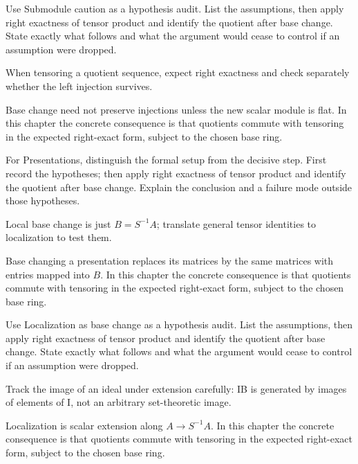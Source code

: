 \begin{exercise}\label{exr:v11-04}
Use Submodule caution as a hypothesis audit. List the assumptions, then apply right exactness of tensor product and identify the quotient after base change. State exactly what follows and what the argument would cease to control if an assumption were dropped.
\end{exercise}
\begin{hint}
When tensoring a quotient sequence, expect right exactness and check separately whether the left injection survives.
\end{hint}
\begin{solution}
Base change need not preserve injections unless the new scalar module is flat. In this chapter the concrete consequence is that quotients commute with tensoring in the expected right-exact form, subject to the chosen base ring.
\end{solution}

\begin{exercise}\label{exr:v11-05}
For Presentations, distinguish the formal setup from the decisive step. First record the hypotheses; then apply right exactness of tensor product and identify the quotient after base change. Explain the conclusion and a failure mode outside those hypotheses.
\end{exercise}
\begin{hint}
Local base change is just \(B=S^{-1}A\); translate general tensor identities to localization to test them.
\end{hint}
\begin{solution}
Base changing a presentation replaces its matrices by the same matrices with entries mapped into $B$. In this chapter the concrete consequence is that quotients commute with tensoring in the expected right-exact form, subject to the chosen base ring.
\end{solution}

\begin{exercise}\label{exr:v11-06}
Use Localization as base change as a hypothesis audit. List the assumptions, then apply right exactness of tensor product and identify the quotient after base change. State exactly what follows and what the argument would cease to control if an assumption were dropped.
\end{exercise}
\begin{hint}
Track the image of an ideal under extension carefully: IB is generated by images of elements of I, not an arbitrary set-theoretic image.
\end{hint}
\begin{solution}
Localization is scalar extension along $A\to S^{-1}A$. In this chapter the concrete consequence is that quotients commute with tensoring in the expected right-exact form, subject to the chosen base ring.
\end{solution}

